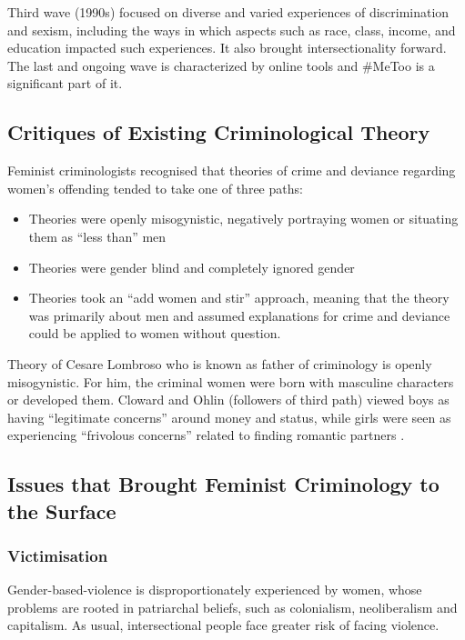 \documentclass{article}
\begin{document}
Third wave (1990s) focused on diverse and varied experiences of discrimination and sexism, including the ways in which aspects such as race, class, income, and education impacted such experiences. It also brought intersectionality forward. The last and ongoing wave is characterized by online tools and \#MeToo is a significant part of it.

\subsection{Critiques of Existing Criminological Theory}

Feminist criminologists recognised that theories of crime and deviance regarding women’s offending tended to take one of three paths:

\begin{itemize}
    \item Theories were openly misogynistic, negatively portraying women or situating them as “less than” men
    \item Theories were gender blind and completely ignored gender
    \item Theories took an “add women and stir” approach, meaning that the theory was primarily about men and assumed explanations for crime and deviance could be applied to women without question.
\end{itemize}

Theory of Cesare Lombroso who is known as father of criminology is openly misogynistic. For him, the criminal women were born with masculine characters or developed them. Cloward and Ohlin (followers of third path) viewed boys as having “legitimate concerns” around money and status, while girls were seen as experiencing “frivolous concerns” related to finding romantic partners .

\subsection{Issues that Brought Feminist Criminology to the Surface}

\subsubsection*{Victimisation}

Gender-based-violence is disproportionately experienced by women, whose problems are rooted in patriarchal beliefs, such as colonialism, neoliberalism and capitalism. As usual, intersectional people face greater risk of facing violence.
\end{document}

